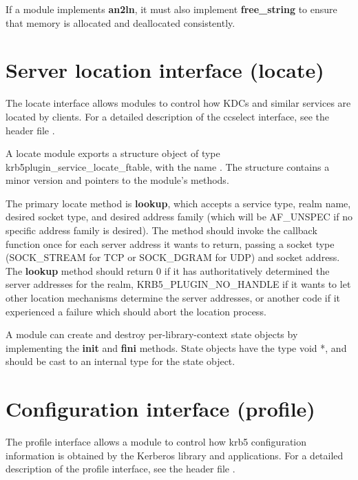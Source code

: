\documentclass[letterpaper,10pt,english]{sphinxmanual}
\begin{document}
If a module implements \textbf{an2ln}, it must also implement
\textbf{free\_string} to ensure that memory is allocated and deallocated
consistently.


\section{Server location interface (locate)}
\label{plugindev/locate:server-location-interface-locate}\label{plugindev/locate::doc}
The locate interface allows modules to control how KDCs and similar
services are located by clients.  For a detailed description of the
ccselect interface, see the header file .

A locate module exports a structure object of type
krb5plugin\_service\_locate\_ftable, with the name .
The structure contains a minor version and pointers to the module's
methods.

The primary locate method is \textbf{lookup}, which accepts a service type,
realm name, desired socket type, and desired address family (which
will be AF\_UNSPEC if no specific address family is desired).  The
method should invoke the callback function once for each server
address it wants to return, passing a socket type (SOCK\_STREAM for TCP
or SOCK\_DGRAM for UDP) and socket address.  The \textbf{lookup} method
should return 0 if it has authoritatively determined the server
addresses for the realm, KRB5\_PLUGIN\_NO\_HANDLE if it wants to let
other location mechanisms determine the server addresses, or another
code if it experienced a failure which should abort the location
process.

A module can create and destroy per-library-context state objects by
implementing the \textbf{init} and \textbf{fini} methods.  State objects have
the type void *, and should be cast to an internal type for the state
object.


\section{Configuration interface (profile)}
\label{plugindev/profile:configuration-interface-profile}\label{plugindev/profile::doc}\label{plugindev/profile:profile-plugin}
The profile interface allows a module to control how krb5
configuration information is obtained by the Kerberos library and
applications.  For a detailed description of the profile interface,
see the header file .
\end{document}
